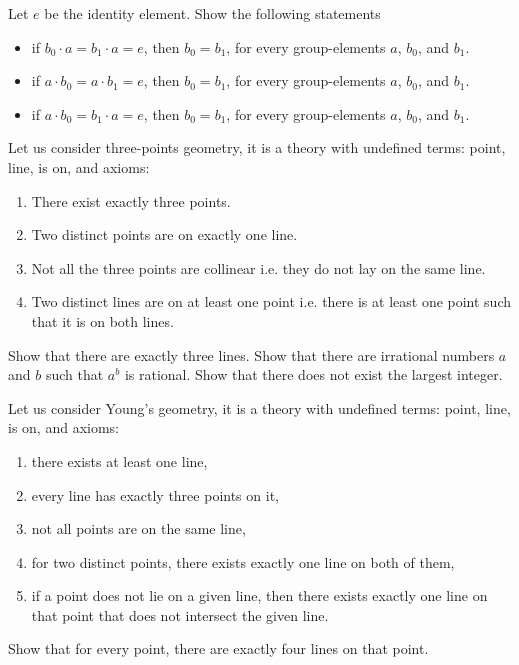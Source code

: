 \begin{exercises}
    Let $e$ be the identity element. Show the following statements
    \begin{itemize}
      \item if $b_0 \cdot a = b_1 \cdot a = e$, then $b_0 = b_1$, for every
        group-elements $a$, $b_0$, and $b_1$.
      \item if $a \cdot b_0 = a \cdot b_1 = e$, then $b_0 = b_1$, for every
        group-elements $a$, $b_0$, and $b_1$.
      \item if $a \cdot b_0 = b_1 \cdot a = e$, then $b_0 = b_1$, for every
        group-elements $a$, $b_0$, and $b_1$.
    \end{itemize}
  \exercise Let us consider three-points geometry, it is a theory with
    undefined terms: point, line, is on, and axioms:
    \begin{enumerate}
        \item There exist exactly three points.
        \item Two distinct points are on exactly one line.
        \item Not all the three points are collinear i.e. they do not lay on the
            same line.
        \item Two distinct lines are on at least one point i.e. there is at
          least one point such that it is on both lines.
    \end{enumerate}

    Show that there are exactly three lines.
  \exercise Show that there are irrational numbers $a$ and $b$ such that
    $a^b$ is rational.
  \exercise Show that there does not exist the largest integer.

  \exercise Let us consider Young's geometry, it is a theory with undefined
    terms: point, line, is on, and axioms:
    \begin{enumerate}
        \item there exists at least one line,
        \item every line has exactly three points on it,
        \item not all points are on the same line,
        \item for two distinct points, there exists exactly one line on both of
          them,
        \item if a point does not lie on a given line, then there exists exactly
          one line on that point that does not intersect the given line.
    \end{enumerate}

    Show that for every point, there are exactly four lines on that point.

\end{exercises}
